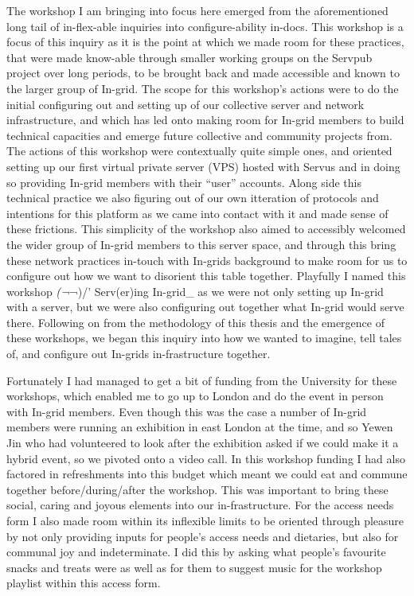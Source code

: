 The workshop I am bringing into focus here emerged from the
aforementioned long tail of in-flex-able inquiries into
configure-ability in-docs. This workshop is a focus of this inquiry as
it is the point at which we made room for these practices, that were
made know-able through smaller working groups on the Servpub project
over long periods, to be brought back and made accessible and known to
the larger group of In-grid. The scope for this workshop's actions were
to do the initial configuring out and setting up of our collective
server and network infrastructure, and which has led onto making room
for In-grid members to build technical capacities and emerge future
collective and community projects from. The actions of this workshop
were contextually quite simple ones, and oriented setting up our first
virtual private server (VPS) hosted with Servus and in doing so
providing In-grid members with their ``user'' accounts. Along side this
technical practice we also figuring out of our own itteration of
protocols and intentions for this platform as we came into contact with
it and made sense of these frictions. This simplicity of the workshop
also aimed to accessibly welcomed the wider group of In-grid members to
this server space, and through this bring these network practices
in-touch with In-grids background to make room for us to configure out
how we want to disorient this table together. Playfully I named this
workshop \emph{(¬}¬)/' Serv(er)ing In-grid\_ as we were not only setting
up In-grid with a server, but we were also configuring out together what
In-grid would serve there. Following on from the methodology of this
thesis and the emergence of these workshops, we began this inquiry into
how we wanted to imagine, tell tales of, and configure out In-grids
in-frastructure together.

Fortunately I had managed to get a bit of funding from the University
for these workshops, which enabled me to go up to London and do the
event in person with In-grid members. Even though this was the case a
number of In-grid members were running an exhibition in east London at
the time, and so Yewen Jin who had volunteered to look after the
exhibition asked if we could make it a hybrid event, so we pivoted onto
a video call. In this workshop funding I had also factored in
refreshments into this budget which meant we could eat and commune
together before/during/after the workshop. This was important to bring
these social, caring and joyous elements into our in-frastructure. For
the access needs form I also made room within its inflexible limits to
be oriented through pleasure by not only providing inputs for people's
access needs and dietaries, but also for communal joy and indeterminate.
I did this by asking what people's favourite snacks and treats were as
well as for them to suggest music for the workshop playlist within this
access form.

